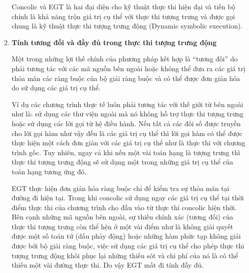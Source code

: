 \documentclass[12pt,a4paper]{article}
\begin{document}
\begin{enumerate}
Concolic và EGT là hai đại diện cho kỹ thuật thực thi hiện đại và tiến bộ chính là khả năng trộn giá trị cụ thể với thực thi tượng trưng và được gọi chung là kỹ thuật thực thi tượng trưng động (Dynamic symbolic execution).

\item \textbf{Tính tương đối và đầy đủ trong thực thi tượng trưng động}

Một trong những lợi thế chính của phương pháp kết hợp là “tương đối” do phải tương tác với các mã nguồn bên ngoài hoặc không thể đưa ra các giá trị thỏa mãn các ràng buộc của bộ giải ràng buộc và có thể được đơn giản hóa do sử dụng các giá trị cụ thể.

Ví dụ các chương trình thực tế luôn phải tương tác với thế giới từ bên ngoài như là: sử dụng các thư viện ngoài mà nó không hỗ trợ thực thi tượng trưng hoặc sử dụng các lời gọi từ hệ điều hành. Nếu tất cả các đối số được truyền cho lời gọi hàm như vậy đều là các giá trị cụ thể thì lời gọi hàm có thể được thực hiện một cách đơn giản với các giá trị cụ thể như là thực thi với chương trình gốc. Tuy nhiên, ngay cả khi nếu một vài toán hạng là tượng trưng thì thực thi tượng trưng động sẽ sử dụng một trong những giá trị cụ thể của toán hạng tương ứng đó.

EGT thực hiện đơn giản hóa ràng buộc chỉ để kiểm tra sự thỏa mãn tại đường đi hiện tại. Trong khi concolic sử dụng ngay các giá trị cụ thể tại thời điểm thực thi của chương trình cho đầu vào từ thực thi concolic hiện thời. Bên cạnh những mã nguồn bên ngoài, sự thiếu chính xác (tương đối) của thực thi tượng trưng còn thể hện ở một vài điểm như là không giải quyết được một số toán tử (dấu phảy động) hoặc những hàm phức tạp không giải được bởi bộ giải ràng buộc, việc sử dụng các giá trị cụ thể cho phép thực thi tượng trưng động khôi phục lại những thiếu sót và chi phí của nó là có thể thiếu một vài đường thực thi. Do vậy EGT mất đi tính đầy đủ.


\end{enumerate}
\end{document}
